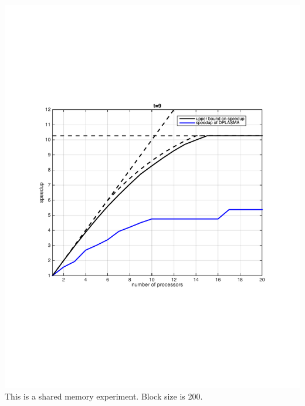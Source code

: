 \begin{frame}

\includegraphics[width=.80\textwidth]{dague_faverge/plot__t9.pdf}\\

This is a shared memory experiment. Block size is 200.

\end{frame}



